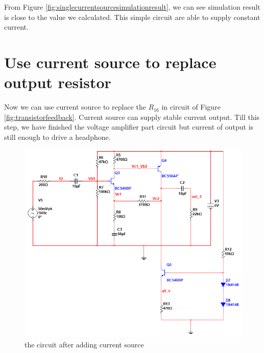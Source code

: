From Figure \ref{fig:singlecurrentsourcesimulationresult}, we can see simulation result is close to the value we calculated. This simple circuit are able to supply constant current.


\section{Use current source to replace output resistor}

Now we can use current source to replace the  $ R_{16} $  in circuit of Figure \ref{fig:transistorfeedback}.
Current source can supply stable current output. Till this step, we have finished the voltage amplifier part circuit but current of output is still enough to drive a headphone.
 
\begin{figure}[htbp]
	\centering
	\includegraphics[scale=0.6 ]{"../Photo/Chap3/add cuurent source"}
	\caption{the circuit after adding current source}
	\label{fig:addcuurentsource}
\end{figure}